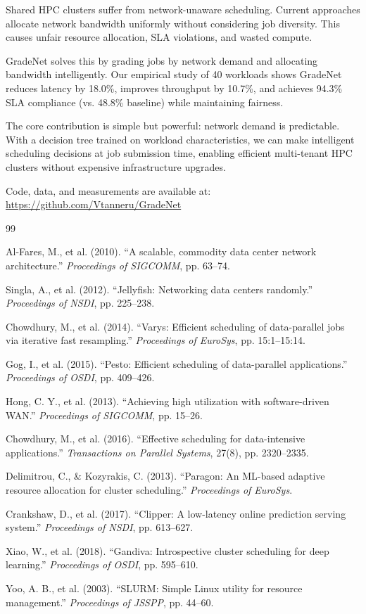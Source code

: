 \documentclass[conference]{IEEEtran}
\begin{document}
Shared HPC clusters suffer from network-unaware scheduling. Current approaches allocate network bandwidth uniformly without considering job diversity. This causes unfair resource allocation, SLA violations, and wasted compute.

GradeNet solves this by grading jobs by network demand and allocating bandwidth intelligently. Our empirical study of 40 workloads shows GradeNet reduces latency by 18.0\%, improves throughput by 10.7\%, and achieves 94.3\% SLA compliance (vs. 48.8\% baseline) while maintaining fairness.

The core contribution is simple but powerful: network demand is predictable. With a decision tree trained on workload characteristics, we can make intelligent scheduling decisions at job submission time, enabling efficient multi-tenant HPC clusters without expensive infrastructure upgrades.

Code, data, and measurements are available at: \url{https://github.com/Vtanneru/GradeNet}

\begin{thebibliography}{99}

 Al-Fares, M., et al. (2010). ``A scalable, commodity data center network architecture.'' \textit{Proceedings of SIGCOMM}, pp. 63--74.

 Singla, A., et al. (2012). ``Jellyfish: Networking data centers randomly.'' \textit{Proceedings of NSDI}, pp. 225--238.

 Chowdhury, M., et al. (2014). ``Varys: Efficient scheduling of data-parallel jobs via iterative fast resampling.'' \textit{Proceedings of EuroSys}, pp. 15:1--15:14.

 Gog, I., et al. (2015). ``Pesto: Efficient scheduling of data-parallel applications.'' \textit{Proceedings of OSDI}, pp. 409--426.

 Hong, C. Y., et al. (2013). ``Achieving high utilization with software-driven WAN.'' \textit{Proceedings of SIGCOMM}, pp. 15--26.

 Chowdhury, M., et al. (2016). ``Effective scheduling for data-intensive applications.'' \textit{Transactions on Parallel Systems}, 27(8), pp. 2320--2335.

 Delimitrou, C., \& Kozyrakis, C. (2013). ``Paragon: An ML-based adaptive resource allocation for cluster scheduling.'' \textit{Proceedings of EuroSys}.

 Crankshaw, D., et al. (2017). ``Clipper: A low-latency online prediction serving system.'' \textit{Proceedings of NSDI}, pp. 613--627.

 Xiao, W., et al. (2018). ``Gandiva: Introspective cluster scheduling for deep learning.'' \textit{Proceedings of OSDI}, pp. 595--610.

 Yoo, A. B., et al. (2003). ``SLURM: Simple Linux utility for resource management.'' \textit{Proceedings of JSSPP}, pp. 44--60.

\end{thebibliography}
\end{document}
